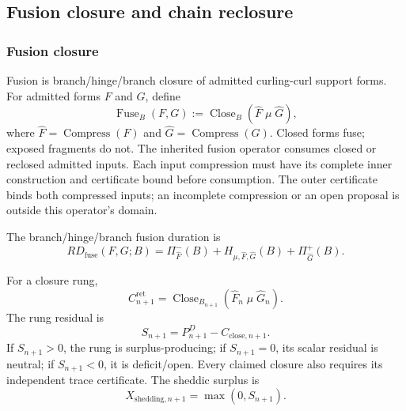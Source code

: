 \subsection{Fusion closure and chain reclosure}\label{sec:fusion-closure-chain-reclosure}

\subsubsection{Fusion closure}\label{subsec:fusion-closure}
Fusion is branch/hinge/branch closure of admitted curling-curl support forms. For admitted forms \(F\) and \(G\), define
\begin{equation}
\operatorname{Fuse}_{B}(F,G)
:=
\operatorname{Close}_{B}
\left(
\widehat F\;\mu\;\widehat G
\right),
\label{eq:fusion-closure}
\end{equation}
where \(\widehat F=\operatorname{Compress}(F)\) and \(\widehat G=\operatorname{Compress}(G)\). Closed forms fuse; exposed fragments do not.
The inherited fusion operator consumes closed or reclosed admitted inputs.
Each input compression must have its complete inner construction and certificate
bound before consumption. The outer certificate binds both compressed inputs;
an incomplete compression or an open proposal is outside this operator's domain.

The branch/hinge/branch fusion duration is
\begin{equation}
RD_{\mathrm{fuse}}(F,G;B)
=
\Pi^-_{\widehat F}(B)+H_{\mu,\widehat F,\widehat G}(B)+\Pi^+_{\widehat G}(B).
\label{eq:fusion-branch-hinge-duration}
\end{equation}

For a closure rung,
\begin{equation}
C^{\mathrm{ret}}_{n+1}
=
\operatorname{Close}_{B_{n+1}}
\left(
\widehat F_n\;\mu\;\widehat G_n
\right).
\label{eq:fusion-ladder-rung}
\end{equation}
The rung residual is
\begin{equation}
S_{n+1}=P^D_{n+1}-C_{\mathrm{close},n+1}.
\label{eq:fusion-rung-residual}
\end{equation}
If \(S_{n+1}>0\), the rung is surplus-producing; if \(S_{n+1}=0\), its scalar residual is neutral; if \(S_{n+1}<0\), it is deficit/open. Every claimed closure also requires its independent trace certificate. The sheddic surplus is
\begin{equation}
X_{\mathrm{shedding},n+1}=\max(0,S_{n+1}).
\label{eq:fusion-rung-shedding-surplus}
\end{equation}

